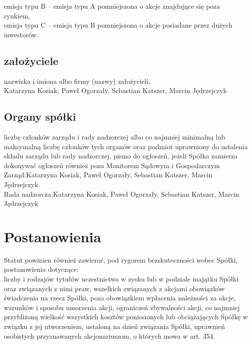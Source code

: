 \documentclass[a4paper, 11pt]{article}
\begin{document}
emisja typu B – emisja typu A pomniejszona o akcje znajdujące się poza rynkiem,\\
				
emisja typu C – emisja typu B pomniejszona o akcje posiadane przez dużych inwestorów.\\
\subsection{założyciele}
nazwiska i imiona albo firmy (nazwy) założycieli,\\
Katarzyna Kosiak, Paweł Ogorzały, Sebastian Katszer, Marcin Jędrzejczyk\\
\subsection{Organy spółki}
liczbę członków zarządu i rady nadzorczej albo co najmniej minimalną lub maksymalną liczbę członków tych organów oraz podmiot uprawniony do ustalenia składu zarządu lub rady nadzorczej, pismo do ogłoszeń, jeżeli Spółka zamierza dokonywać ogłoszeń również poza Monitorem Sądowym i Gospodarczym\\
Zarząd:Katarzyna Kosiak, Paweł Ogorzały, Sebastian Katszer, Marcin Jędrzejczyk\\
Rada nadzorcza:Katarzyna Kosiak, Paweł Ogorzały, Sebastian Katszer, Marcin Jędrzejczyk\\

\section{Postanowienia}
Statut powinien również zawierać, pod rygorem bezskuteczności wobec Spółki, postanowienia dotyczące:\\
liczby i rodzajów tytułów uczestnictwa w zysku lub w podziale majątku Spółki oraz związanych z nimi praw, wszelkich związanych z akcjami obowiązków świadczenia na rzecz Spółki, poza obowiązkiem wpłacenia należności za akcje,
warunków i sposobu umorzenia akcji,
ograniczeń zbywalności akcji,
co najmniej przybliżoną wielkość wszystkich kosztów poniesionych lub obciążających Spółkę w związku z jej utworzeniem, ustaloną na dzień związania
 Spółki,
uprawnień osobistych przyznawanych akcjonariuszom, o których mowa w art. 354.
\end{document}
